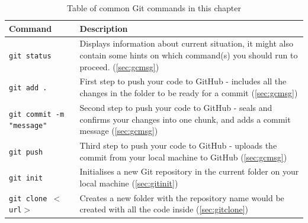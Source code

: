 \begin{table}[H]
    \centering
    \caption{Table of common Git commands in this chapter}
    \vspace{6mm}
    \begin{tabular}{|m{7em}|m{23em}|}
        \hline
        \textbf{Command} & 
        Description 
        \\ \hline \hline
        
        \texttt{git status} &
        Displays information about current situation, it might also contain some hints on which command(s) you should run to proceed. (\cref{sec:gcmsg})
        \\ \hline
        
        \texttt{git add .} &
        First step to push your code to GitHub - includes all the changes in the folder to be ready for a commit (\cref{sec:gcmsg})
        \\ \hline
        
        \texttt{git commit -m "message"} &
        Second step to push your code to GitHub - seals and confirms your changes into one chunk, and adds a commit message (\cref{sec:gcmsg})
        \\ \hline
        
        \texttt{git push} &
        Third step to push your code to GitHub - uploads the commit from your local machine to GitHub (\cref{sec:gcmsg})
        \\ \hline
        
        \texttt{git init} &
        Initialises a new Git repository in the current folder on your local machine (\cref{sec:gitinit})
        \\ \hline
        
        \texttt{git clone $<$url$>$} &
        Creates a new folder with the repository name would be created with all the code inside (\cref{sec:gitclone})
        \\ \hline
        
        
    \end{tabular}
\end{table}